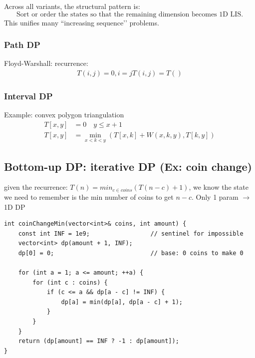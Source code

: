 \documentclass[9pt]{extarticle}
\begin{document}
Across all variants, the structural pattern is:
\[
\text{Sort or order the states so that the remaining dimension becomes 1D LIS.}
\]
This unifies many “increasing sequence’’ problems.

\subsubsection*{Path DP}
Floyd-Warshall: recurrence:
\begin{align*}
    T(i, j) = 0, i = j
    T(i, j) = T()
\end{align*}
\subsubsection*{Interval DP}
Example: convex polygon triangulation\\
\begin{align*}
T[x, y] &= 0 \quad {y \leq x + 1}\\
T[x, y] &= \min_{x<k<y}(T[x, k] + W(x, k, y), T[k, y])
\end{align*}

\subsection*{Bottom-up DP: iterative DP (Ex: coin change)}

given the recurrence: $T(n) = min_{c \in coins}(T(n - c) + 1)$, we know the state we need to remember is the min number of coins
to get $n - c$. Only 1 param $\rightarrow$ 1D DP
\begin{lstlisting}
int coinChangeMin(vector<int>& coins, int amount) {
    const int INF = 1e9;                 // sentinel for impossible
    vector<int> dp(amount + 1, INF);
    dp[0] = 0;                           // base: 0 coins to make 0

    for (int a = 1; a <= amount; ++a) {
        for (int c : coins) {
            if (c <= a && dp[a - c] != INF) {
                dp[a] = min(dp[a], dp[a - c] + 1);
            }
        }
    }
    return (dp[amount] == INF ? -1 : dp[amount]);
}
\end{lstlisting}
\end{document}
